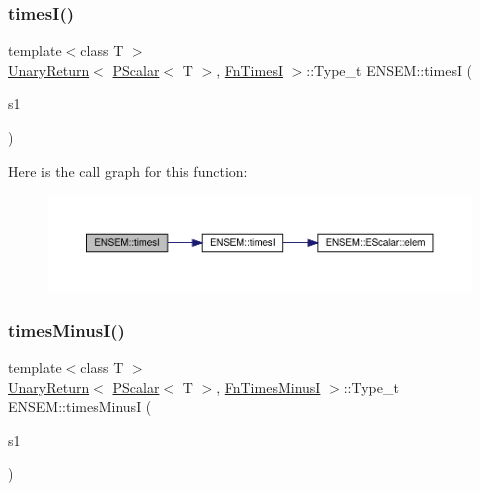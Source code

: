 \subsubsection{\texorpdfstring{timesI()}{timesI()}}
{\footnotesize\ttfamily template$<$class T $>$ \\
\mbox{\hyperlink{structENSEM_1_1UnaryReturn}{Unary\+Return}}$<$ \mbox{\hyperlink{classENSEM_1_1PScalar}{P\+Scalar}}$<$ T $>$, \mbox{\hyperlink{structENSEM_1_1FnTimesI}{Fn\+TimesI}} $>$\+::Type\+\_\+t E\+N\+S\+E\+M\+::timesI (\begin{DoxyParamCaption}\item[{const \mbox{\hyperlink{classENSEM_1_1PScalar}{P\+Scalar}}$<$ T $>$ \&}]{s1 }\end{DoxyParamCaption})\hspace{0.3cm}{\ttfamily [inline]}}

Here is the call graph for this function\+:\nopagebreak
\begin{figure}[H]
\begin{center}
\leavevmode
\includegraphics[width=350pt]{db/dcc/group__primscalar_ga70f6abe538ba4ee394447d572f919fc0_cgraph}
\end{center}
\end{figure}
\mbox{\label{group__primscalar_gabd11ad8f843bcbe3cfbf91ad061f864a}} 
\subsubsection{\texorpdfstring{timesMinusI()}{timesMinusI()}}
{\footnotesize\ttfamily template$<$class T $>$ \\
\mbox{\hyperlink{structENSEM_1_1UnaryReturn}{Unary\+Return}}$<$ \mbox{\hyperlink{classENSEM_1_1PScalar}{P\+Scalar}}$<$ T $>$, \mbox{\hyperlink{structENSEM_1_1FnTimesMinusI}{Fn\+Times\+MinusI}} $>$\+::Type\+\_\+t E\+N\+S\+E\+M\+::times\+MinusI (\begin{DoxyParamCaption}\item[{const \mbox{\hyperlink{classENSEM_1_1PScalar}{P\+Scalar}}$<$ T $>$ \&}]{s1 }\end{DoxyParamCaption})\hspace{0.3cm}{\ttfamily [inline]}}

